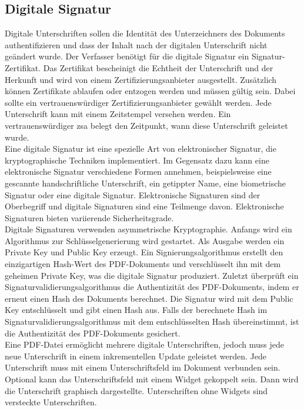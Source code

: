 \subsection{Digitale Signatur}
Digitale Unterschriften sollen die Identität des Unterzeichners des Dokuments authentifizieren und dass der Inhalt nach der digitalen Unterschrift nicht geändert wurde. Der Verfasser benötigt für die digitale Signatur ein Signatur-Zertifikat. Das Zertifikat bescheinigt die Echtheit der Unterschrift und der Herkunft und wird von einem Zertifizierungsanbieter ausgestellt. Zusätzlich können Zertifikate ablaufen oder entzogen werden und müssen gültig sein. Dabei sollte ein vertrauenswürdiger Zertifizierungsanbieter gewählt werden. Jede Unterschrift kann mit einem Zeitstempel versehen werden. Ein vertrauenswürdiger \gls{zsa} belegt den Zeitpunkt, wann diese Unterschrift geleistet wurde. \cite{softx} \\
Eine digitale Signatur ist eine spezielle Art von elektronischer Signatur, die kryptographische Techniken implementiert. Im Gegensatz dazu kann eine elektronische Signatur verschiedene Formen annehmen, beispielsweise eine gescannte handschriftliche Unterschrift, ein getippter Name, eine biometrische Signatur oder eine digitale Signatur. Elektronische Signaturen sind der Oberbegriff und digitale Signaturen sind eine Teilmenge davon. Elektronische Signaturen bieten variierende Sicherheitsgrade. \cite{adobe-pdf-pades} \\
Digitale Signaturen verwenden asymmetrische Kryptographie. Anfangs wird ein Algorithmus zur Schlüsselgenerierung wird gestartet. Als Ausgabe werden ein Private Key und Public Key erzeugt. Ein Signierungsalgorithmus erstellt den einzigartigen Hash-Wert des PDF-Dokuments und verschlüsselt ihn mit dem geheimen Private Key, was die digitale Signatur produziert. Zuletzt überprüft ein Signaturvalidierungsalgorithmus die Authentizität des PDF-Dokuments, indem er erneut einen Hash des Dokuments berechnet. Die Signatur wird mit dem Public Key entschlüsselt und gibt einen Hash aus. Falls der berechnete Hash im Signaturvalidierungsalgorithmus mit dem entschlüsselten Hash übereinstimmt, ist die Authentizität des PDF-Dokuments gesichert. \cite{signature} \\
Eine PDF-Datei ermöglicht mehrere digitale Unterschriften, jedoch muss jede neue Unterschrift in einem inkrementellen Update geleistet werden. Jede Unterschrift muss mit einem Unterschriftsfeld im Dokument verbunden sein. Optional kann das Unterschriftsfeld mit einem Widget gekoppelt sein. Dann wird die Unterschrift graphisch dargestellte. Unterschriften ohne Widgets sind versteckte Unterschriften. \cite{softx} 

